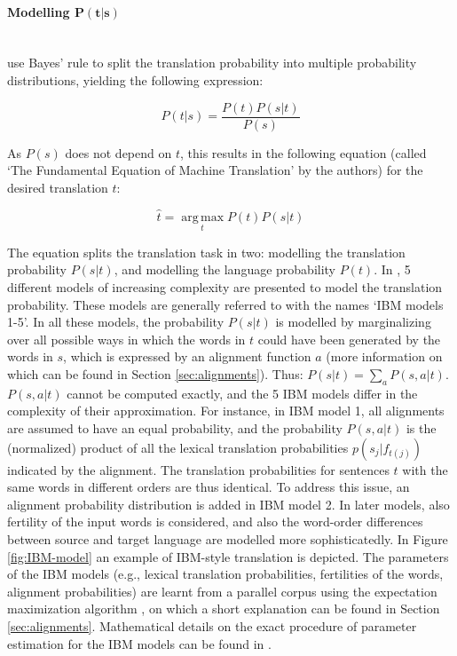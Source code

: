 \documentclass{report}
\newcommand{\myparagraph}[1]{\paragraph{#1}\mbox{}\\}
\theoremstyle{break}
\begin{document}
\myparagraph{Modelling $\mathbf{P(t|s)}$}
\citeauthor{brown1988statistical} use Bayes' rule to split the translation probability into multiple probability distributions, yielding the following expression:

\[
P(t|s) = \frac{P(t)P(s|t)}{P(s)}
\]

As $P(s)$ does not depend on $t$, this results in the following equation (called `The Fundamental Equation of Machine Translation' by the authors) for the desired translation $\hat{t}$:

\[
\hat{t} = \operatorname*{arg\,max}_t P(t)P(s|t)
\]

The equation splits the translation task in two: modelling the translation probability $P(s|t)$, and modelling the language probability $P(t)$. In \cite{brown1993mathematics}, 5 different models of increasing complexity are presented to model the translation probability. These models are generally referred to with the names `IBM models 1-5'. In all these models, the probability $P(s|t)$ is modelled by marginalizing over all possible ways in which the words in $t$ could have been generated by the words in $s$, which is expressed by an alignment function $a$ (more information on which can be found in Section \ref{sec:alignments}). Thus: $P(s|t) = \sum_a P(s,a|t)$. $P(s,a|t)$ cannot be computed exactly, and the 5 IBM models differ in the complexity of their approximation. For instance, in IBM model 1, all alignments are assumed to have an equal probability, and the probability $P(s,a|t)$ is the (normalized) product of all the lexical translation probabilities $p(s_j|f_{t(j)})$ indicated by the alignment. The translation probabilities for sentences $t$ with the same words in different orders are thus identical. To address this issue, an alignment probability distribution is added in IBM model 2. In later models, also fertility of the input words is considered, and also the word-order differences between source and target language are modelled more sophisticatedly. In Figure \ref{fig:IBM-model} an example of IBM-style translation is depicted. The parameters of the IBM models (e.g., lexical translation probabilities, fertilities of the words, alignment probabilities) are learnt from a parallel corpus using the expectation maximization algorithm \citep{dempster1977maximum}, on which a short explanation can be found in Section \ref{sec:alignments}. Mathematical details on the exact procedure of parameter estimation for the IBM models can be found in \cite{brown1993mathematics}.
\end{document}
